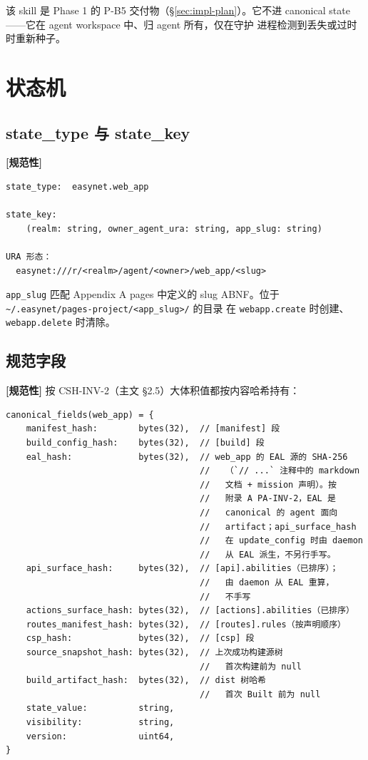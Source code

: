 \documentclass[11pt,a4paper]{article}
\newcommand{\normsv}{\textcolor{normativecolor}{\textbf{[规范性]}}\xspace}
\theoremstyle{definition}
\begin{document}
该 skill 是 Phase 1 的 P-B5 交付物（\S\ref{sec:impl-plan}）。它不进
canonical state——它在 agent workspace 中、归 agent 所有，仅在守护
进程检测到丢失或过时时重新种子。

\section{状态机}
\label{sec:state-machine}

\subsection{state\_type 与 state\_key}

\normsv{}

\begin{lstlisting}
state_type:  easynet.web_app

state_key:
    (realm: string, owner_agent_ura: string, app_slug: string)

URA 形态：
  easynet:///r/<realm>/agent/<owner>/web_app/<slug>
\end{lstlisting}

\texttt{app\_slug} 匹配 Appendix A pages 中定义的 slug ABNF。位于
\texttt{\textasciitilde/.easynet/pages-project/<app\_slug>/} 的目录
在 \texttt{webapp.create} 时创建、\texttt{webapp.delete} 时清除。

\subsection{规范字段}

\normsv{} 按 CSH-INV-2（主文 \S2.5）大体积值都按内容哈希持有：

\begin{lstlisting}
canonical_fields(web_app) = {
    manifest_hash:        bytes(32),  // [manifest] 段
    build_config_hash:    bytes(32),  // [build] 段
    eal_hash:             bytes(32),  // web_app 的 EAL 源的 SHA-256
                                      //   （`// ...` 注释中的 markdown
                                      //   文档 + mission 声明）。按
                                      //   附录 A PA-INV-2，EAL 是
                                      //   canonical 的 agent 面向
                                      //   artifact；api_surface_hash
                                      //   在 update_config 时由 daemon
                                      //   从 EAL 派生，不另行手写。
    api_surface_hash:     bytes(32),  // [api].abilities（已排序）；
                                      //   由 daemon 从 EAL 重算，
                                      //   不手写
    actions_surface_hash: bytes(32),  // [actions].abilities（已排序）
    routes_manifest_hash: bytes(32),  // [routes].rules（按声明顺序）
    csp_hash:             bytes(32),  // [csp] 段
    source_snapshot_hash: bytes(32),  // 上次成功构建源树
                                      //   首次构建前为 null
    build_artifact_hash:  bytes(32),  // dist 树哈希
                                      //   首次 Built 前为 null
    state_value:          string,
    visibility:           string,
    version:              uint64,
}
\end{lstlisting}
\end{document}
